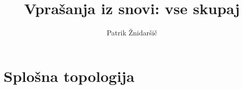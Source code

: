 \documentclass[12pt]{book}
\title{Vprašanja iz snovi: vse skupaj}
\author{Patrik Žnidaršič}
\date{}
\newcounter{vprasanja}
\begin{document}
\maketitle

\setcounter{vprasanja}{0}
\chapter{Splošna topologija}

\end{document}

